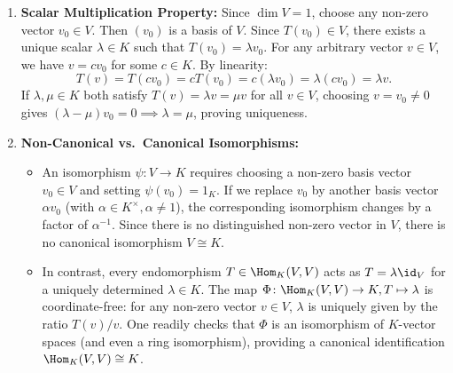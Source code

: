 \begin{exercisesolution}
\label{sol:one_dim_endomorphism_canonical_iso}
\begin{enumerate}[label=\textbf{(\alph*)}]
    \item \textbf{Scalar Multiplication Property:}
    Since $\dim V = 1$, choose any non-zero vector $v_0 \in V$. Then $(v_0)$ is a basis of $V$.
    Since $T(v_0) \in V$, there exists a unique scalar $\lambda \in K$ such that $T(v_0) = \lambda v_0$.
    For any arbitrary vector $v \in V$, we have $v = c v_0$ for some $c \in K$. By linearity:
    \[
    T(v) = T(c v_0) = c T(v_0) = c (\lambda v_0) = \lambda (c v_0) = \lambda v.
    \]
    If $\lambda, \mu \in K$ both satisfy $T(v) = \lambda v = \mu v$ for all $v \in V$, choosing $v = v_0 \ne 0$ gives $(\lambda - \mu)v_0 = 0 \implies \lambda = \mu$, proving uniqueness.

    \item \textbf{Non-Canonical vs.~Canonical Isomorphisms:}
    \begin{itemize}
        \item An isomorphism $\psi \colon V \to K$ requires choosing a non-zero basis vector $v_0 \in V$ and setting $\psi(v_0) = 1_K$. If we replace $v_0$ by another basis vector $\alpha v_0$ (with $\alpha \in K^\times, \alpha \ne 1$), the corresponding isomorphism changes by a factor of $\alpha^{-1}$. Since there is no distinguished non-zero vector in $V$, there is no canonical isomorphism $V \cong K$.
        \item In contrast, every endomorphism $T \in \Hom_K(V, V)$ acts as $T = \lambda \id_V$ for a uniquely determined $\lambda \in K$. The map $\Phi \colon \Hom_K(V, V) \to K, T \mapsto \lambda$ is coordinate-free: for any non-zero vector $v \in V$, $\lambda$ is uniquely given by the ratio $T(v)/v$. One readily checks that $\Phi$ is an isomorphism of $K$-vector spaces (and even a ring isomorphism), providing a canonical identification $\Hom_K(V, V) \cong K$.
    \end{itemize}
\end{enumerate}
\end{exercisesolution}


